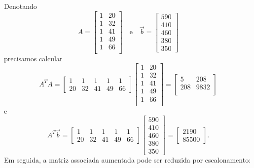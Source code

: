 \documentclass[../livro.tex]{subfiles}  %
\begin{document}
\begin{example}
  Denotando
  \begin{equation}
  A =
  \begin{bmatrix}
    1 & 20 \\
    1 & 32 \\
    1 & 41 \\
    1 & 49 \\
    1 & 66 \\
  \end{bmatrix} \quad \text{e} \quad
  \vec{b} =
  \begin{bmatrix}
    590 \\ 410 \\ 460 \\ 380 \\ 350
  \end{bmatrix}
  \end{equation} precisamos calcular
  \begin{equation}
  A^T A =
  \begin{bmatrix}
    1 & 1 & 1 & 1 & 1 \\
    20 & 32 & 41 & 49 & 66
  \end{bmatrix}
  \begin{bmatrix}
    1 & 20 \\
    1 & 32 \\
    1 & 41 \\
    1 & 49 \\
    1 & 66 \\
  \end{bmatrix} =
  \begin{bmatrix}
    5    & 208 \\
    208  & 9832  \\
  \end{bmatrix}
  \end{equation} e
  \begin{equation}
  A^T \vec{b} =
  \begin{bmatrix}
    1 & 1 & 1 & 1 & 1 \\
    20 & 32 & 41 & 49 & 66
  \end{bmatrix}
  \begin{bmatrix}
    590 \\ 410 \\ 460 \\ 380 \\ 350
  \end{bmatrix} =
  \begin{bmatrix}
    2190 \\ 85500
  \end{bmatrix}.
  \end{equation} Em seguida, a matriz associada aumentada pode ser reduzida por escalonamento:

\end{example}
\end{document}
